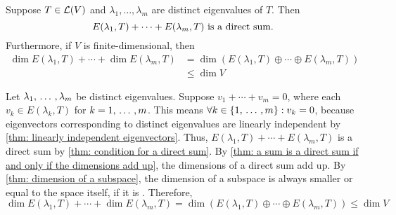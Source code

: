 \setcounter{thm}{53}
\begin{thm} 
  \label{thm: sum of eigenspaces is a direct sum}
  Suppose $T\in \mathcal{L} (V)$ and $\lambda_1, \dots, \lambda_m$ are distinct eigenvalues of $T$. Then
  \begin{equation}
    E(\lambda_1, T) + \cdots + E(\lambda_m, T) $ is a direct sum.$
  \end{equation}
  Furthermore, if $V$ is finite-dimensional, then
  \begin{equation}
    \begin{aligned}
      \dim E(\lambda_1, T) + \cdots + \dim E(\lambda_m, T)
      & = \dim \left( E(\lambda_1, T)  \oplus \cdots \oplus E(\lambda_m, T) \right) \\
      & \leq \dim V
    \end{aligned}
  \end{equation}
\end{thm}
\begin{prf}
  Let $\lambda_1, {\, \ldots \,\,}, \lambda_m$ be distinct eigenvalues. Suppose $v_1 + \cdots + v_m = 0$, where each $v_k \in E(\lambda_k, T)$ for $k = 1, {\, \ldots \,\,}, m $. This means $\forall k \in \{ 1, {\, \ldots \,\,}, m\}: v_k = 0$, because eigenvectors corresponding to distinct eigenvalues are linearly independent by \ref{thm: linearly independent eigenvectors}. Thus, $E(\lambda_1, T) + \cdots + E(\lambda_m, T)$ is a direct sum by \ref{thm: condition for a direct sum}.
  By \ref{thm: a sum is a direct sum if and only if the dimensions add up}, the dimensions of a direct sum add up. By \ref{thm: dimension of a subspace}, the dimension of a subspace is always smaller or equal to the space itself, if it is \fd. Therefore,
  \begin{equation}
      \dim E(\lambda_1, T) + \cdots + \dim E(\lambda_m, T)
    = \dim \left( E(\lambda_1, T)  \oplus \cdots \oplus E(\lambda_m, T) \right) \leq \dim V
  \end{equation}
  \vspace{-1em}
\end{prf}

